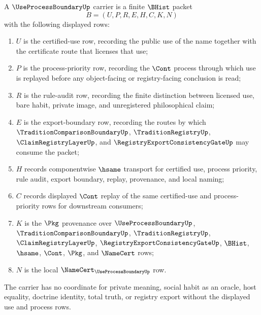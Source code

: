 \begin{definition}
\label{def:use-process-boundary-carrier}
A $\UseProcessBoundaryUp$ carrier is a finite $\BHist$ packet
$$
B=(U,P,R,E,H,C,K,N)
$$
with the following displayed rows:
\begin{enumerate}
\item $U$ is the certified-use row, recording the public use of the name together with the certificate route that licenses that use;
\item $P$ is the process-priority row, recording the $\Cont$ process through which use is replayed before any object-facing or registry-facing conclusion is read;
\item $R$ is the rule-audit row, recording the finite distinction between licensed use, bare habit, private image, and unregistered philosophical claim;
\item $E$ is the export-boundary row, recording the routes by which $\TraditionComparisonBoundaryUp$, $\TraditionRegistryUp$, $\ClaimRegistryLayerUp$, and $\RegistryExportConsistencyGateUp$ may consume the packet;
\item $H$ records componentwise $\hsame$ transport for certified use, process priority, rule audit, export boundary, replay, provenance, and local naming;
\item $C$ records displayed $\Cont$ replay of the same certified-use and process-priority rows for downstream consumers;
\item $K$ is the $\Pkg$ provenance over $\UseProcessBoundaryUp$, $\TraditionComparisonBoundaryUp$, $\TraditionRegistryUp$, $\ClaimRegistryLayerUp$, $\RegistryExportConsistencyGateUp$, $\BHist$, $\hsame$, $\Cont$, $\Pkg$, and $\NameCert$ rows;
\item $N$ is the local $\NameCert_{\UseProcessBoundaryUp}$ row.
\end{enumerate}
The carrier has no coordinate for private meaning, social habit as an oracle, host equality, doctrine identity, total truth, or registry export without the displayed use and process rows.
\end{definition}

